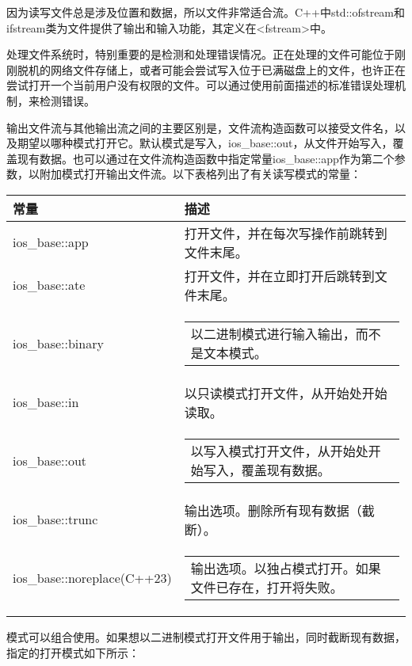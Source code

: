 
因为读写文件总是涉及位置和数据，所以文件非常适合流。C++中std::ofstream和ifstream类为文件提供了输出和输入功能，其定义在<fstream>中。

处理文件系统时，特别重要的是检测和处理错误情况。正在处理的文件可能位于刚刚脱机的网络文件存储上，或者可能会尝试写入位于已满磁盘上的文件，也许正在尝试打开一个当前用户没有权限的文件。可以通过使用前面描述的标准错误处理机制，来检测错误。

输出文件流与其他输出流之间的主要区别是，文件流构造函数可以接受文件名，以及期望以哪种模式打开它。默认模式是写入，ios\_base::out，从文件开始写入，覆盖现有数据。也可以通过在文件流构造函数中指定常量ios\_base::app作为第二个参数，以附加模式打开输出文件流。以下表格列出了有关读写模式的常量：


\begin{longtable}{|l|l|}
\hline
\textbf{常量} & \textbf{描述}                                    \\ \hline
\endfirsthead
%
\endhead
%
ios\_base::app    & 打开文件，并在每次写操作前跳转到文件末尾。
    \\ \hline
ios\_base::ate    & 打开文件，并在立即打开后跳转到文件末尾。
 \\ \hline
ios\_base::binary           & \begin{tabular}[c]{@{}l@{}}以二进制模式进行输入输出，而不是文本模式。
\end{tabular} \\ \hline
ios\_base::in     & 以只读模式打开文件，从开始处开始读取。
         \\ \hline
ios\_base::out              & \begin{tabular}[c]{@{}l@{}}以写入模式打开文件，从开始处开始写入，覆盖现有数据。
\end{tabular}            \\ \hline
ios\_base::trunc  & 输出选项。删除所有现有数据（截断）。
    \\ \hline
ios\_base::noreplace(C++23) & \begin{tabular}[c]{@{}l@{}}输出选项。以独占模式打开。如果文件已存在，打开将失败。
\end{tabular}     \\ \hline
\end{longtable}

模式可以组合使用。如果想以二进制模式打开文件用于输出，同时截断现有数据，指定的打开模式如下所示：

